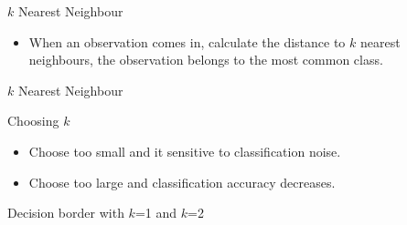 \documentclass[compress]{beamer}
\providecommand{\tightlist}{%
  \setlength{\itemsep}{0pt}\setlength{\parskip}{0pt}}
\begin{document}
\begin{frame}{\(k\) Nearest Neighbour}

\begin{itemize}
\tightlist
\item
  When an observation comes in, calculate the distance to \(k\) nearest
  neighbours, the observation belongs to the most common class.
\end{itemize}

\end{frame}

\begin{frame}{\(k\) Nearest Neighbour}

Choosing \(k\)

\begin{itemize}
\tightlist
\item
  Choose too small and it sensitive to classification noise.
\item
  Choose too large and classification accuracy decreases.
\end{itemize}

Decision border with \(k\)=1 and \(k\)=2

\end{frame}
\end{document}
